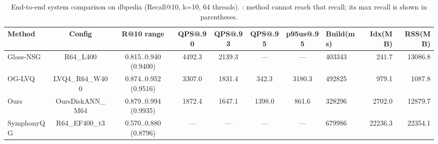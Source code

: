 \begin{table}[t]
\centering
\small
\caption{End-to-end system comparison on dbpedia (Recall@10, k=10, 64 threads). \textemdash{}: method cannot reach that recall; its max recall is shown in parentheses.}
\label{tab:system_fair}
\begin{tabular}{lcccccclrr}
\toprule
Method & Config & R@10 range & QPS@.90 & QPS@.93 & QPS@.95 & p95us@.95 & Build(ms) & Idx(MB) & RSS(MB) \\
\midrule
Glass-NSG & R64_L400 & 0.815..0.940 (0.9400) & 4492.3 & 2139.3 & — & — & 403343 & 241.7 & 13086.8 \\
OG-LVQ & LVQ4_R64_W400 & 0.874..0.952 (0.9516) & 3307.0 & 1831.4 & 342.3 & 3180.3 & 492825 & 979.1 & 1087.8 \\
Ours & OursDiskANN_M64 & 0.879..0.994 (0.9935) & 1872.4 & 1647.1 & 1398.0 & 861.6 & 328296 & 2702.0 & 12879.7 \\
SymphonyQG & R64_EF400_t3 & 0.570..0.880 (0.8796) & — & — & — & — & 679986 & 22236.3 & 22354.1 \\
\bottomrule
\end{tabular}
\end{table}

